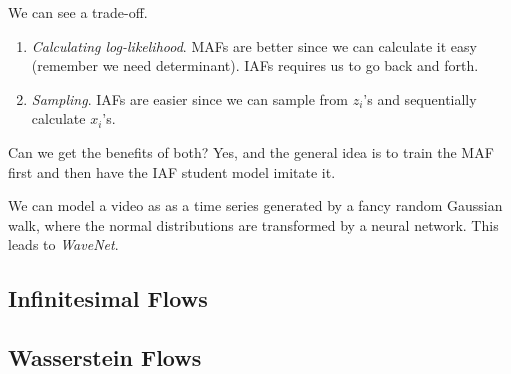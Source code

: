 \documentclass{article}
\begin{document}
  We can see a trade-off. 
  \begin{enumerate}
    \item \textit{Calculating log-likelihood}. MAFs are better since we can calculate it easy (remember we need determinant). IAFs requires us to go back and forth. 
    \item \textit{Sampling}. IAFs are easier since we can sample from $z_i$'s and sequentially calculate $x_i$'s. 
  \end{enumerate}

  Can we get the benefits of both? Yes, and the general idea is to train the MAF first and then have the IAF student model imitate it. 

  \begin{example}
    We can model a video as as a time series generated by a fancy random Gaussian walk, where the normal distributions are transformed by a neural network. This leads to \textit{WaveNet}. 
  \end{example}

\subsection{Infinitesimal Flows} 

\subsection{Wasserstein Flows} 




\end{document}
